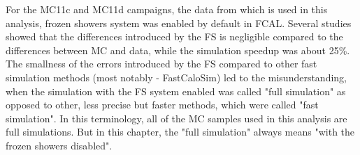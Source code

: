 \begin{figure}
\end{figure}

\begin{figure}
\end{figure}

For the MC11c and MC11d campaigns, the data from which is used in this analysis, frozen showers system was enabled by default in FCAL. Several studies showed that the differences introduced by the FS is negligible compared to the differences between MC and data, while the simulation speedup was about 25\%. The smallness of the errors introduced by the FS compared to other fast simulation methods (most notably - FastCaloSim) led to the misunderstanding, when the simulation with the FS system enabled was called "full simulation" as opposed to other, less precise but faster methods, which were called "fast simulation". In this terminology, all of the MC samples used in this analysis are full simulations. But in this chapter, the "full simulation" always means "with the frozen showers disabled".

